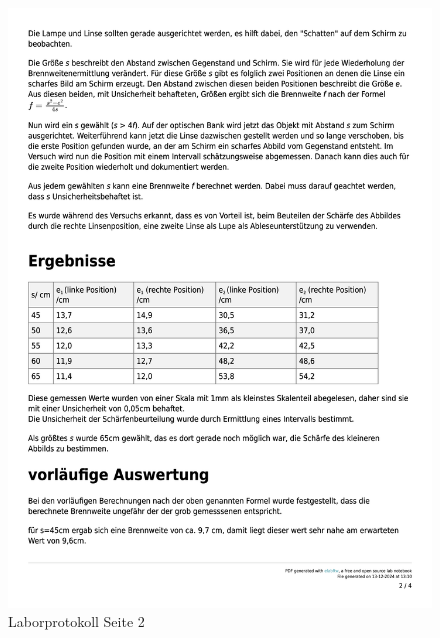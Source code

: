 \documentclass[a4paper,12pt]{article}
\begin{document}
\begin{figure}[H]
    \centering
    \includegraphics[width=1\textwidth]{bilder/Protokoll_Bilder/Protokoll2.png}
    \caption{Laborprotokoll Seite 2}
    \label{fig:Protokoll2}
\end{figure}

\newpage
\end{document}
